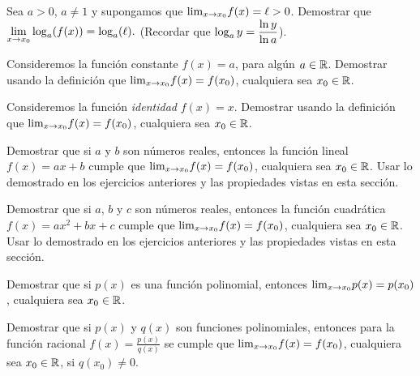 \item Sea $a>0$, $a\neq 1$ y supongamos que ${\lim_{x\to x_0}} f(x)=\ell>0$.
Demostrar que $\displaystyle{\ensuremath{\lim_{x\to x_0}}} \log_a(f(x)) = \log_a(\ell).$ (Recordar que $\displaystyle\log_a y = \frac{\ln y}{\ln a}$).

\item Consideremos la función constante $f(x)=a$, para algún $a\in\mathbb{R}$. Demostrar usando la definición que ${\lim_{x\to x_0}} f(x)=f(x_0)$, cualquiera sea $x_0\in\mathbb{R}$.
\item Consideremos la función \emph{identidad} $f(x)=x$. Demostrar usando la definición que ${\lim_{x\to x_0}} f(x)=f(x_0)$, cualquiera sea $x_0\in\mathbb{R}$.
\item Demostrar que si $a$ y $b$ son números reales, entonces la función lineal $f(x)=ax+b$ cumple que ${\lim_{x\to x_0}} f(x)=f(x_0)$, cualquiera sea $x_0\in\mathbb{R}$.
Usar lo demostrado en los ejercicios anteriores y las propiedades vistas en esta sección.
\item Demostrar que si $a$, $b$ y $c$ son números reales, entonces la función cuadrática $f(x)=ax^2+bx+c$ cumple que ${\lim_{x\to x_0}} f(x)=f(x_0)$, cualquiera sea $x_0\in\mathbb{R}$.
Usar lo demostrado en los ejercicios anteriores y las propiedades vistas en esta sección.
\item Demostrar que si $p(x)$ es una función polinomial, entonces ${\lim_{x\to x_0}} p(x)=p(x_0)$, cualquiera sea $x_0\in\mathbb{R}$.
\item Demostrar que si $p(x)$ y $q(x)$ son funciones polinomiales, entonces para la función racional $f(x)= \frac{p(x)}{q(x)}$ se cumple que ${\lim_{x\to x_0}} f(x)=f(x_0)$, cualquiera sea $x_0\in\mathbb{R}$, si $q(x_0)\neq0$.

